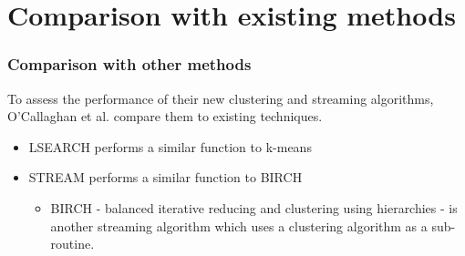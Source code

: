 \documentclass{beamer}
\begin{document}
\section{Comparison with existing methods}
\frame
{
  \frametitle{Comparison with other methods}
  To assess the performance of their new clustering and streaming algorithms, O'Callaghan et al. compare them to existing techniques.
  
  \bigskip 
  \begin{itemize}
  \item{LSEARCH performs a similar function to k-means}
  \item{STREAM performs a similar function to BIRCH
    \begin{itemize}
      \item{BIRCH - balanced iterative reducing and clustering using hierarchies - is another streaming algorithm which uses a clustering algorithm as a sub-routine.}
    \end{itemize}
  }
  	     
  \end{itemize}
}
\end{document}
